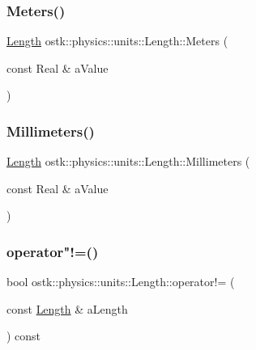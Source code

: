 \subsubsection{\texorpdfstring{Meters()}{Meters()}}
{\footnotesize\ttfamily \hyperlink{classostk_1_1physics_1_1units_1_1_length}{Length} ostk\+::physics\+::units\+::\+Length\+::\+Meters (\begin{DoxyParamCaption}\item[{const Real \&}]{a\+Value }\end{DoxyParamCaption})\hspace{0.3cm}{\ttfamily [static]}}

\mbox{\label{classostk_1_1physics_1_1units_1_1_length_a37a93f5c180723b39410c5e9757a9384}} 
\subsubsection{\texorpdfstring{Millimeters()}{Millimeters()}}
{\footnotesize\ttfamily \hyperlink{classostk_1_1physics_1_1units_1_1_length}{Length} ostk\+::physics\+::units\+::\+Length\+::\+Millimeters (\begin{DoxyParamCaption}\item[{const Real \&}]{a\+Value }\end{DoxyParamCaption})\hspace{0.3cm}{\ttfamily [static]}}

\mbox{\label{classostk_1_1physics_1_1units_1_1_length_ab2f0fcca55d97a7d27d27b24ffba5e8c}} 
\subsubsection{\texorpdfstring{operator"!=()}{operator!=()}}
{\footnotesize\ttfamily bool ostk\+::physics\+::units\+::\+Length\+::operator!= (\begin{DoxyParamCaption}\item[{const \hyperlink{classostk_1_1physics_1_1units_1_1_length}{Length} \&}]{a\+Length }\end{DoxyParamCaption}) const}

